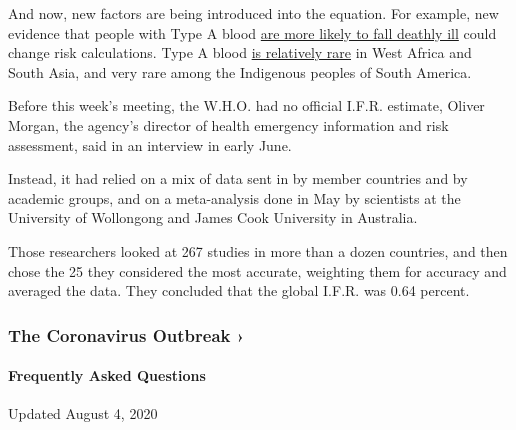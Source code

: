 And now, new factors are being introduced into the equation. For
example, new evidence that people with Type A blood
\href{https://www.nytimes.com/2020/06/03/health/coronavirus-blood-type-genetics.html}{are
more likely to fall deathly ill} could change risk calculations. Type A
blood
\href{https://en.wikipedia.org/wiki/Blood_type_distribution_by_country}{is
relatively rare} in West Africa and South Asia, and very rare among the
Indigenous peoples of South America.

Before this week's meeting, the W.H.O. had no official I.F.R. estimate,
Oliver Morgan, the agency's director of health emergency information and
risk assessment, said in an interview in early June.

Instead, it had relied on a mix of data sent in by member countries and
by academic groups, and on a meta-analysis done in May by scientists at
the University of Wollongong and James Cook University in Australia.

Those researchers looked at 267 studies in more than a dozen countries,
and then chose the 25 they considered the most accurate, weighting them
for accuracy and averaged the data. They concluded that the global
I.F.R. was 0.64 percent.

\href{https://www.nytimes.com/news-event/coronavirus?action=click\&pgtype=Article\&state=default\&region=MAIN_CONTENT_3\&context=storylines_faq}{}

\hypertarget{the-coronavirus-outbreak-}{%
\subsubsection{The Coronavirus Outbreak
›}\label{the-coronavirus-outbreak-}}

\hypertarget{frequently-asked-questions}{%
\paragraph{Frequently Asked
Questions}\label{frequently-asked-questions}}

Updated August 4, 2020

